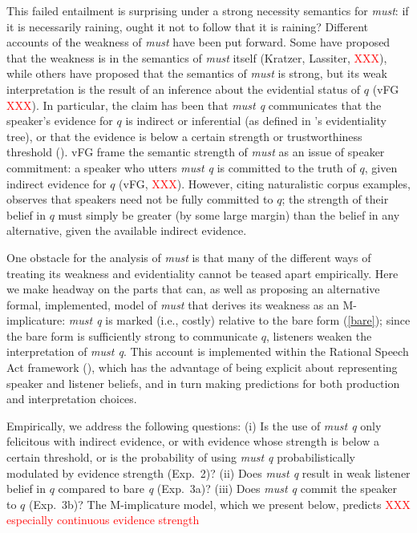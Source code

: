 \documentclass[11pt]{article}
\newcommand{\red}[1]{\textcolor{Red}{#1}}
\begin{document}
This failed entailment is surprising under a strong necessity semantics for \emph{must}: if it is necessarily raining, ought it not to follow that it is raining? Different accounts of the weakness of \emph{must} have been put forward. Some have proposed that the weakness is in the semantics of \emph{must} itself (Kratzer, Lassiter, \red{XXX}), while others have proposed that the semantics of \emph{must} is strong, but its weak interpretation is the result of an inference about the evidential status of $q$ (vFG \red{XXX}). In particular, the claim has been that \emph{must q} communicates that the speaker's evidence for $q$ is indirect or inferential (as defined in 's evidentiality tree), or that the evidence is below a certain strength or trustworthiness threshold (\cite{matthewson2015}). vFG frame the semantic strength of \emph{must} as an issue of speaker commitment: a speaker who utters \emph{must q} is committed to the truth of $q$, given indirect evidence for $q$ (vFG, \red{XXX}). However, citing naturalistic corpus examples,  observes that speakers need not be fully committed to $q$; the strength of their belief in $q$ must simply be greater (by some large margin) than the belief in any alternative, given the available indirect evidence.

One obstacle for the analysis of \emph{must} is that many of the different ways of treating its weakness and evidentiality cannot be teased apart empirically. Here we make headway on the parts that can, as well as proposing an alternative formal, implemented, model of \emph{must} that derives its weakness as an M-implicature: \emph{must q} is marked (i.e., costly) relative to the bare form (\ref{bare}); since the bare form is sufficiently strong to communicate $q$, listeners weaken the interpretation of \emph{must q}. This account is implemented within the Rational Speech Act framework (\cite{frank2012, goodmanstuhlmueller2013}), which has the advantage of being explicit about representing speaker and listener beliefs, and in turn making predictions for both production and  interpretation choices.

Empirically, we address the following questions: (i) Is the use of \emph{must q} only felicitous with indirect evidence, or with evidence whose strength is below a certain threshold, or is the probability of using \emph{must q} probabilistically modulated by evidence strength (Exp.~2)? (ii) Does \emph{must q} result in weak listener belief in $q$ compared to bare \emph{q} (Exp.~3a)? (iii) Does \emph{must q} commit the speaker to $q$ (Exp.~3b)? The M-implicature model, which we present below, predicts \red{XXX especially continuous evidence strength}
\end{document}
